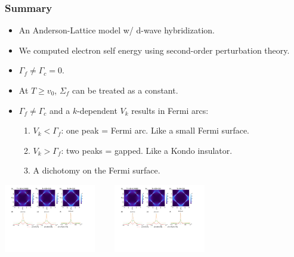 \documentclass[xcolor=table, 10pt, aspectratio=169]{beamer}
\begin{document}
\begin{frame}
\frametitle{Summary}
\begin{itemize}
\item<1-7> An Anderson-Lattice model w/ d-wave hybridization.
\item<2-5> We computed electron self energy using second-order perturbation theory.
\item<3-8> $\Gamma_f\neq\Gamma_c=0$.
\item<4-6> At $T\geq v_0$, $\Sigma_f$ can be treated as a constant.
\item<5-9> $\Gamma_f\neq\Gamma_c$ and a $k$-dependent $V_k$ results in Fermi arcs:
\begin{enumerate}
\item $V_k<\Gamma_f$: one peak = Fermi arc. Like a small Fermi surface.
\item $V_k>\Gamma_f$: two peaks = gapped. Like a Kondo insulator.
\item A dichotomy on the Fermi surface.
\end{enumerate}
\end{itemize}
\begin{center}
	\includegraphics[height=3cm]{arc1}~~~~
	\includegraphics[height=3cm]{arc2}
\end{center}
\end{frame}


\end{document}
